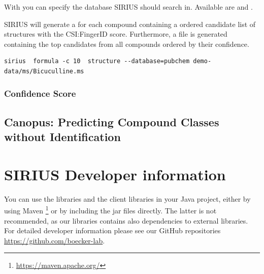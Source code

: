 \documentclass[letterpaper,10pt,openany,oneside]{sphinxmanual}
\newcommand{\todo}[1]{}
\begin{document}
With  you can specify the database SIRIUS should search in. Available are  and . 

SIRIUS will generate a  for each compound containing a ordered candidate list of structures with the CSI:FingerID score. Furthermore, a  file is generated containing the top candidates from all compounds ordered by their confidence.

\begin{Verbatim}[commandchars=\\\{\}]
sirius  formula -c 10  structure --database=pubchem demo-data/ms/Bicuculline.ms
\end{Verbatim}

\subsection*{Confidence Score}
\todo{describe the new confidence Score}


\section{Canopus: Predicting Compound Classes without Identification}


\chapter{SIRIUS Developer information}
\label{library:sirius-java-library}\label{library::doc}

You can use the  libraries and the  client libraries in your Java project, either by using
Maven \footnote{\sphinxAtStartFootnote\url{https://maven.apache.org/}} or by
including the jar files directly. The latter is not recommended, as our libraries contains also dependencies to external libraries. For detailed developer information please see our GitHub repositories \url{https://github.com/boecker-lab}. 
\end{document}

